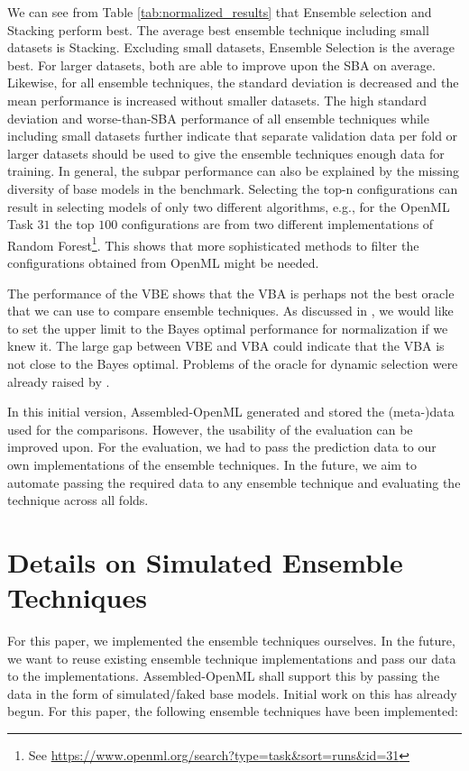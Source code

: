 \documentclass[11pt]{article}
\begin{document}
We can see from Table \ref{tab:normalized_results} that Ensemble selection and Stacking perform best.
The average best ensemble technique including small datasets is Stacking. Excluding small datasets, Ensemble Selection is the average best. 
For larger datasets, both are able to improve upon the SBA on average. Likewise, for all ensemble techniques, the standard deviation is decreased and the mean performance is increased without smaller datasets.
The high standard deviation and worse-than-SBA performance of all ensemble techniques while including small datasets further indicate that separate validation data per fold or larger datasets should be used to give the ensemble techniques enough data for training. 
In general, the subpar performance can also be explained by the missing diversity of base models in the benchmark. Selecting the top-n configurations can result in selecting models of only two different algorithms, e.g., for the OpenML Task $31$ the top $100$ configurations are from two different implementations of Random Forest\footnote{See \url{https://www.openml.org/search?type=task&sort=runs&id=31}}. This shows that more sophisticated methods to filter the configurations obtained from OpenML might be needed.

The performance of the VBE shows that the VBA is perhaps not the best oracle that we can use to compare ensemble techniques.
As discussed in \cite{caruana2004ensemble}, we would like to set the upper limit to the Bayes optimal performance for normalization if we knew it. 
The large gap between VBE and VBA could indicate that the VBA is not close to the Bayes optimal. 
Problems of the oracle for dynamic selection were already raised by \cite{cruz2018dynamic}. 

In this initial version, Assembled-OpenML generated and stored the (meta-)data used for the comparisons. However, the usability of the evaluation can be improved upon. For the evaluation, we had to pass the prediction data to our own implementations of the ensemble techniques. In the future, we aim to automate passing the required data to any ensemble technique and evaluating the technique across all folds. 

\newpage

\section{Details on Simulated Ensemble Techniques}
For this paper, we implemented the ensemble techniques ourselves.
In the future, we want to reuse existing ensemble technique implementations and pass our data to the implementations. Assembled-OpenML shall support this by passing the data in the form of simulated/faked base models. Initial work on this has already begun. 
For this paper, the following ensemble techniques have been implemented:
\end{document}
